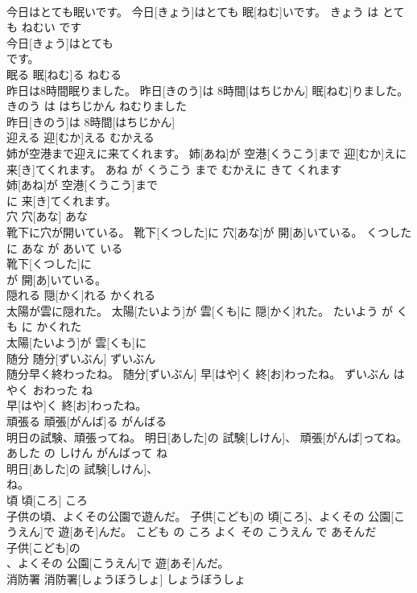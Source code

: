 \documentclass[8pt]{extreport}
\begin{document}
\begin{CJK}{UTF8}{min}
\\	今日はとても眠いです。	今日[きょう]はとても 眠[ねむ]いです。	きょう は とても ねむい です	
\\	今日[きょう]はとても
\\	です。			
\\	眠る	眠[ねむ]る	ねむる	
\\	昨日は8時間眠りました。	昨日[きのう]は 8時間[はちじかん] 眠[ねむ]りました。	きのう は はちじかん ねむりました	
\\	昨日[きのう]は 8時間[はちじかん]
\\	迎える	迎[むか]える	むかえる	
\\	姉が空港まで迎えに来てくれます。	姉[あね]が 空港[くうこう]まで 迎[むか]えに 来[き]てくれます。	あね が くうこう まで むかえに きて くれます	
\\	姉[あね]が 空港[くうこう]まで
\\	に 来[き]てくれます。			
\\	穴	穴[あな]	あな	
\\	靴下に穴が開いている。	靴下[くつした]に 穴[あな]が 開[あ]いている。	くつした に あな が あいて いる	
\\	靴下[くつした]に
\\	が 開[あ]いている。			
\\	隠れる	隠[かく]れる	かくれる	
\\	太陽が雲に隠れた。	太陽[たいよう]が 雲[くも]に 隠[かく]れた。	たいよう が くも に かくれた	
\\	太陽[たいよう]が 雲[くも]に
\\	随分	随分[ずいぶん]	ずいぶん	
\\	随分早く終わったね。	随分[ずいぶん] 早[はや]く 終[お]わったね。	ずいぶん はやく おわった ね	
\\	早[はや]く 終[お]わったね。			
\\	頑張る	頑張[がんば]る	がんばる	
\\	明日の試験、頑張ってね。	明日[あした]の 試験[しけん]、 頑張[がんば]ってね。	あした の しけん がんばって ね	
\\	明日[あした]の 試験[しけん]、
\\	ね。			
\\	頃	頃[ころ]	ころ	
\\	子供の頃、よくその公園で遊んだ。	子供[こども]の 頃[ころ]、よくその 公園[こうえん]で 遊[あそ]んだ。	こども の ころ よく その こうえん で あそんだ	
\\	子供[こども]の
\\	、よくその 公園[こうえん]で 遊[あそ]んだ。			
\\	消防署	消防署[しょうぼうしょ]	しょうぼうしょ	

\end{CJK}
\end{document}
